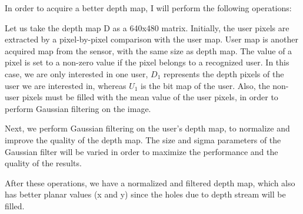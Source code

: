 In order to acquire a better depth map, I will perform the following operations:

Let us take the depth map D as a 640x480 matrix. Initially, the user pixels are
extracted by a pixel-by-pixel comparison with the user map. User map is another
acquired map from the sensor, with the same size as depth map. The value of a
pixel is set to a non-zero value if the pixel belongs to a recognized user. In
this case, we are only interested in one user, $D_1$ represents the depth pixels
of the user we are interested in, whereas $U_1$ is the bit map of the user.
Also, the non-user pixels must be filled with the mean value of the user pixels, in order to perform Gaussian filtering on the image.

Next, we perform Gaussian filtering on the user’s depth map, to normalize and
improve the quality of the depth map. The size and sigma parameters of the Gaussian filter will be varied in order to maximize the performance and the quality of the results. 

After these operations, we have a normalized and filtered depth map, which also
has better planar values (x and y) since the holes due to depth stream will be filled.






